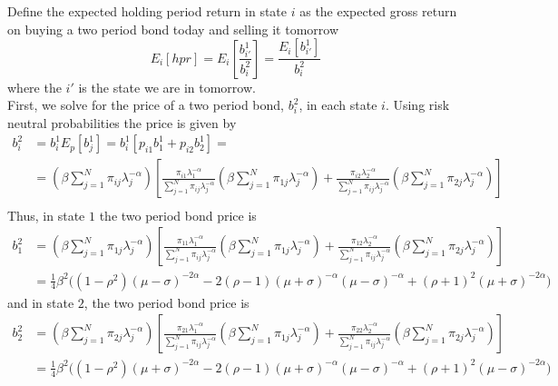 \documentclass[french]{article}
\begin{document}
\begin{enumerate}[I.]
	Define the expected holding period return in state $i$ as the expected gross return on buying a two period bond today and selling it tomorrow
	\begin{equation*}
	E_i\left[hpr\right]	=E_i\left[\frac{b_{i'}^1}{b^2_i}\right]  = \frac{E_i\left[b_{i'}^1\right]}{b^2_i}
	\end{equation*}
	where the $i'$ is the state we are in tomorrow. \\ 
	First, we solve for the price of a two period bond, $b^2_i$, in each state $i$. Using risk neutral probabilities the price is given by 
	\begin{equation}
	\begin{split}
		b_i^2 &= b_i^1E_p\left[b_j^1\right] = b_i^1 \left[p_{i1}b_1^1+p_{i2}b_2^1 \right] = \\
		&= \left(\beta \sum_{j=1}^{N}\pi_{ij}\lambda_j^{-\alpha}\right)\left[\frac{\pi_{i1} \lambda_1^{-\alpha}}{\sum_{j=1}^{N}\pi_{ij}\lambda_j^{-\alpha}}\left(\beta \sum_{j=1}^{N}\pi_{1j}\lambda_j^{-\alpha}\right) + \frac{\pi_{i2} \lambda_2^{-\alpha}}{\sum_{j=1}^{N}\pi_{ij}\lambda_j^{-\alpha}}\left(\beta \sum_{j=1}^{N}\pi_{2j}\lambda_j^{-\alpha}\right)\right]\\
	\end{split}
	\label{eq:two_period_state_bond_prices}
	\end{equation}
	Thus, in state $1$ the two period bond price is
	\begin{equation*}
		\begin{split}
		b_1^2 & = \left(\beta \sum_{j=1}^{N}\pi_{1j}\lambda_j^{-\alpha}\right)\left[\frac{\pi_{11} \lambda_1^{-\alpha}}{\sum_{j=1}^{N}\pi_{ij}\lambda_j^{-\alpha}}\left(\beta \sum_{j=1}^{N}\pi_{1j}\lambda_j^{-\alpha}\right) + \frac{\pi_{12} \lambda_2^{-\alpha}}{\sum_{j=1}^{N}\pi_{ij}\lambda_j^{-\alpha}}\left(\beta \sum_{j=1}^{N}\pi_{2j}\lambda_j^{-\alpha}\right)\right]\\
		&=\frac{1}{4} \beta ^2 \bigg(\left(1-\rho ^2\right)(\mu -\sigma )^{-2 \alpha }-2 (\rho -1) (\mu+\sigma)^{-\alpha } (\mu -\sigma )^{-\alpha}+(\rho +1)^2 (\mu +\sigma )^{-2 \alpha }\bigg)
		\end{split}
	\end{equation*}
	and in state $2$, the two period bond price is 
	\begin{equation*}
	\begin{split}
	b_2^2 & = \left(\beta \sum_{j=1}^{N}\pi_{2j}\lambda_j^{-\alpha}\right)\left[\frac{\pi_{21} \lambda_1^{-\alpha}}{\sum_{j=1}^{N}\pi_{ij}\lambda_j^{-\alpha}}\left(\beta \sum_{j=1}^{N}\pi_{1j}\lambda_j^{-\alpha}\right) + \frac{\pi_{22} \lambda_2^{-\alpha}}{\sum_{j=1}^{N}\pi_{ij}\lambda_j^{-\alpha}}\left(\beta \sum_{j=1}^{N}\pi_{2j}\lambda_j^{-\alpha}\right)\right]\\
	&=\frac{1}{4} \beta ^2 \bigg(\left(1-\rho^2\right)(\mu +\sigma )^{-2 \alpha }-2 (\rho -1) (\mu +\sigma)^{-\alpha } (\mu -\sigma )^{-\alpha }+(\rho +1)^2 (\mu-\sigma )^{-2\alpha }\bigg)
	\end{split}
	\end{equation*}



\end{enumerate}
\end{document}

